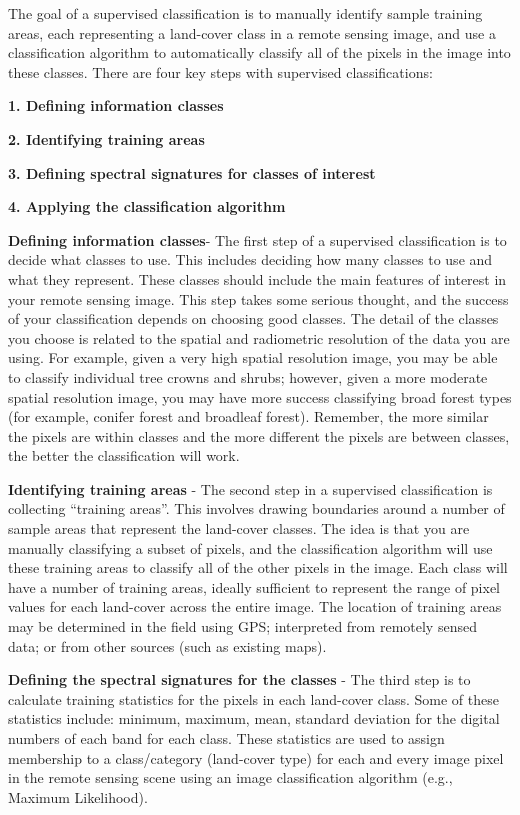 \documentclass[
]{book}
\begin{document}
The goal of a supervised classification is to manually identify sample training areas, each representing a land-cover class in a remote sensing image, and use a classification algorithm to automatically classify all of the pixels in the image into these classes. There are four key steps with supervised classifications:

\textbf{1. Defining information classes}

\textbf{2. Identifying training areas}

\textbf{3. Defining spectral signatures for classes of interest}

\textbf{4. Applying the classification algorithm}

\textbf{Defining information classes}- The first step of a supervised classification is to decide what classes to use. This includes deciding how many classes to use and what they represent. These classes should include the main features of interest in your remote sensing image. This step takes some serious thought, and the success of your classification depends on choosing good classes. The detail of the classes you choose is related to the spatial and radiometric resolution of the data you are using. For example, given a very high spatial resolution image, you may be able to classify individual tree crowns and shrubs; however, given a more moderate spatial resolution image, you may have more success classifying broad forest types (for example, conifer forest and broadleaf forest). Remember, the more similar the pixels are within classes and the more different the pixels are between classes, the better the classification will work.

\textbf{Identifying training areas} - The second step in a supervised classification is collecting ``training areas''. This involves drawing boundaries around a number of sample areas that represent the land-cover classes. The idea is that you are manually classifying a subset of pixels, and the classification algorithm will use these training areas to classify all of the other pixels in the image. Each class will have a number of training areas, ideally sufficient to represent the range of pixel values for each land-cover across the entire image. The location of training areas may be determined in the field using GPS; interpreted from remotely sensed data; or from other sources (such as existing maps).

\textbf{Defining the spectral signatures for the classes} - The third step is to calculate training statistics for the pixels in each land-cover class. Some of these statistics include: minimum, maximum, mean, standard deviation for the digital numbers of each band for each class. These statistics are used to assign membership to a class/category (land-cover type) for each and every image pixel in the remote sensing scene using an image classification algorithm (e.g., Maximum Likelihood).
\end{document}
